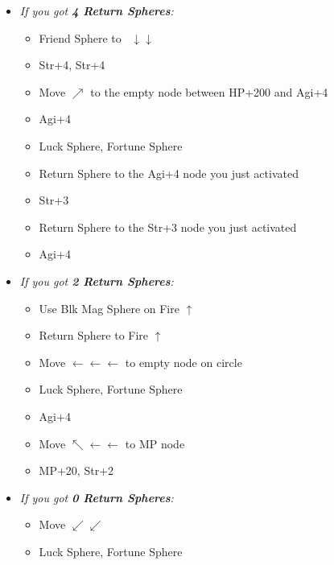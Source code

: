 \begin{spheregrid}
    \begin{itemize}
        \yunaf
        \begin{itemize}
            \item \textit{If you got \textbf{4 Return Spheres}:}
            \begin{itemize}
                \item Friend Sphere to \lulu\ $\downarrow\downarrow$
                \item Str+4, Str+4
                \item Move $\nearrow$ to the empty node between HP+200 and Agi+4
                \item Agi+4
                \item Luck Sphere, Fortune Sphere
                \item Return Sphere to the Agi+4 node you just activated
                \item Str+3
                \item Return Sphere to the Str+3 node you just activated
                \item Agi+4
            \end{itemize}
            \item \textit{If you got \textbf{2 Return Spheres}:}
            \begin{itemize}
                \item Use Blk Mag Sphere on Fire $\uparrow$
                \item Return Sphere to Fire $\uparrow$
                \item Move $\leftarrow\leftarrow\leftarrow$ to empty node on circle
                \item Luck Sphere, Fortune Sphere
                \item Agi+4
                \item Move $\nwarrow\leftarrow\leftarrow$ to MP node
                \item MP+20, Str+2
            \end{itemize}
            \item \textit{If you got \textbf{0 Return Spheres}:}
            \begin{itemize}
                \item Move $\swarrow\swarrow$
                \item Luck Sphere, Fortune Sphere
            \end{itemize}
        \end{itemize}
    \end{itemize}
\end{spheregrid}
